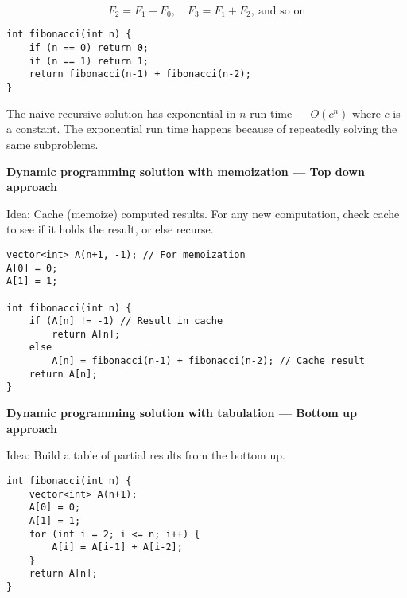 \documentclass{article}
\begin{document}
\[
F_2 = F_1 + F_0,\quad F_3 = F_1 + F_2, \ \text{and so on}
\]

\begin{lstlisting}[style=cppstyle]
int fibonacci(int n) {
    if (n == 0) return 0;
    if (n == 1) return 1;
    return fibonacci(n-1) + fibonacci(n-2);
}
\end{lstlisting}

The naive recursive solution has exponential in \(n\) run time — \(O(c^n)\) where \(c\) is a constant. The exponential run time happens because of repeatedly solving the same subproblems.

\begin{center}
\end{center}

\textbf{Dynamic programming solution with memoization — Top down approach}

Idea: Cache (memoize) computed results. For any new computation, check cache to see if it holds the result, or else recurse.

\begin{lstlisting}[style=cppstyle]
vector<int> A(n+1, -1); // For memoization
A[0] = 0;
A[1] = 1;

int fibonacci(int n) {
    if (A[n] != -1) // Result in cache
        return A[n];
    else
        A[n] = fibonacci(n-1) + fibonacci(n-2); // Cache result
    return A[n];
}
\end{lstlisting}

\textbf{Dynamic programming solution with tabulation — Bottom up approach}

Idea: Build a table of partial results from the bottom up.

\begin{lstlisting}[style=cppstyle]
int fibonacci(int n) {
    vector<int> A(n+1);
    A[0] = 0;
    A[1] = 1;
    for (int i = 2; i <= n; i++) {
        A[i] = A[i-1] + A[i-2];
    }
    return A[n];
}
\end{lstlisting}
\end{document}
